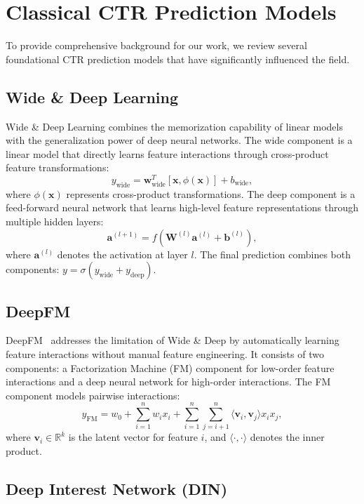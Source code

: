 \section{Classical CTR Prediction Models}

To provide comprehensive background for our work, we review several foundational CTR prediction models that have significantly influenced the field.

\subsection{Wide \& Deep Learning}

Wide \& Deep Learning combines the memorization capability of linear models with the generalization power of deep neural networks. The wide component is a linear model that directly learns feature interactions through cross-product feature transformations:
\[
y_{\text{wide}} = \mathbf{w}^T_{\text{wide}}[\mathbf{x}, \phi(\mathbf{x})] + b_{\text{wide}},
\]
where $\phi(\mathbf{x})$ represents cross-product transformations. The deep component is a feed-forward neural network that learns high-level feature representations through multiple hidden layers:
\[
\mathbf{a}^{(l+1)} = f(\mathbf{W}^{(l)} \mathbf{a}^{(l)} + \mathbf{b}^{(l)}),
\]
where $\mathbf{a}^{(l)}$ denotes the activation at layer $l$. The final prediction combines both components: $y = \sigma(y_{\text{wide}} + y_{\text{deep}})$.

\subsection{DeepFM}

DeepFM~\cite{guo2017deepfm} addresses the limitation of Wide \& Deep by automatically learning feature interactions without manual feature engineering. It consists of two components: a Factorization Machine (FM) component for low-order feature interactions and a deep neural network for high-order interactions. The FM component models pairwise interactions:
\[
y_{\text{FM}} = w_0 + \sum_{i=1}^{n} w_i x_i + \sum_{i=1}^{n} \sum_{j=i+1}^{n} \langle \mathbf{v}_i, \mathbf{v}_j \rangle x_i x_j,
\]
where $\mathbf{v}_i \in \mathbb{R}^k$ is the latent vector for feature $i$, and $\langle \cdot, \cdot \rangle$ denotes the inner product.

\subsection{Deep Interest Network (DIN)}

